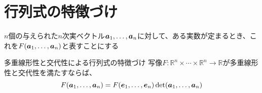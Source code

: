 \documentclass[../../../topic_linear-algebra]{subfiles}
\begin{document}
\sectionline
\section{行列式の特徴づけ}

$n$個の与えられた$n$次実ベクトル$\vb*{a}_1, \ldots, \vb*{a}_n$に対して、ある実数が定まるとき、これを$F(\vb*{a}_1, \ldots, \vb*{a}_n)$と表すことにする

\begin{theorem}{多重線形性と交代性による行列式の特徴づけ}\label{thm:determinant-characterization-by-properties}
  写像$F\colon \mathbb{R}^n \times \cdots \times \mathbb{R}^n \to \mathbb{R}$が多重線形性と交代性を満たすならば、
  \begin{equation*}
    F(\vb*{a}_1, \ldots, \vb*{a}_n) = F(\vb*{e}_1, \ldots, \vb*{e}_n) \det(\vb*{a}_1, \ldots, \vb*{a}_n)
  \end{equation*}
\end{theorem}
\end{document}
